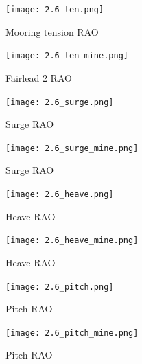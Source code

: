 \documentclass[a4paper, 11pt]{article}
\begin{document}
\begin{figure}[H]
    \begin{minipage}{0.48\textwidth}
        \centering
        \texttt{[image: 2.6\_ten.png]}
        \caption{\small Mooring tension RAO \cite{Robertson2014}}
        \label{fig:2.6_fairten2}
    \end{minipage}
    \hfill
    \begin{minipage}{0.5\textwidth}
        \centering
        \vspace{0.4cm}
        \texttt{[image: 2.6\_ten\_mine.png]}
        \caption{\small Fairlead 2 RAO}
        \label{fig:2.6_fairten2_mine}
    \end{minipage}
\end{figure}

\begin{figure}[H]
    \begin{minipage}{0.48\textwidth}
        \centering
        \texttt{[image: 2.6\_surge.png]}
        \caption{\small Surge RAO \cite{Robertson2014}} 
        \label{fig:2.6_surge}
    \end{minipage}
    \hfill
    \begin{minipage}{0.5\textwidth}
        \centering
        \vspace{-0.2cm}
        \texttt{[image: 2.6\_surge\_mine.png]}
        \caption{\small Surge RAO}
        \label{fig:2.6_surge_mine}
    \end{minipage}
\end{figure}

\begin{figure}[H]
    \begin{minipage}{0.48\textwidth}
        \centering
        \texttt{[image: 2.6\_heave.png]}
        \caption{\small Heave RAO \cite{Robertson2014}}
        \label{fig:2.6_heave}
    \end{minipage}
    \hfill
    \begin{minipage}{0.5\textwidth}
        \centering
        \texttt{[image: 2.6\_heave\_mine.png]}
        \caption{\small Heave RAO} 
        \label{fig:2.6_heave_mine}
    \end{minipage}
\end{figure}

\begin{figure}[H]
    \begin{minipage}{0.48\textwidth}
        \centering
        \texttt{[image: 2.6\_pitch.png]}
        \caption{\small Pitch RAO \cite{Robertson2014}}
        \label{fig:2.6_pitch}
    \end{minipage}
    \hfill
    \begin{minipage}{0.5\textwidth}
        \centering
        \texttt{[image: 2.6\_pitch\_mine.png]}
        \caption{\small Pitch RAO}
        \label{fig:2.6_pitch_mine}
    \end{minipage}
\end{figure}
\end{document}
